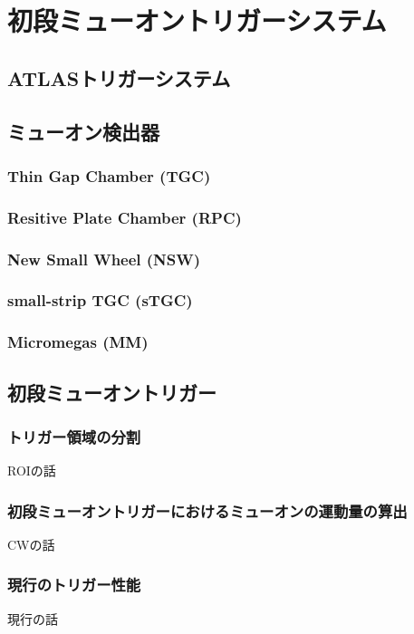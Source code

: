 \chapter{初段ミューオントリガーシステム}
\section{ATLASトリガーシステム}

\section{ミューオン検出器}
\subsection{Thin Gap Chamber (TGC)}

\subsection{Resitive Plate Chamber (RPC)}

\subsection{New Small Wheel (NSW)}

\subsection{small-strip TGC (sTGC)}

\subsection{Micromegas (MM)}

\section{初段ミューオントリガー}

\subsection{トリガー領域の分割}
ROIの話
\subsection{初段ミューオントリガーにおけるミューオンの運動量の算出}
CWの話
\subsection{現行のトリガー性能}
現行の話

